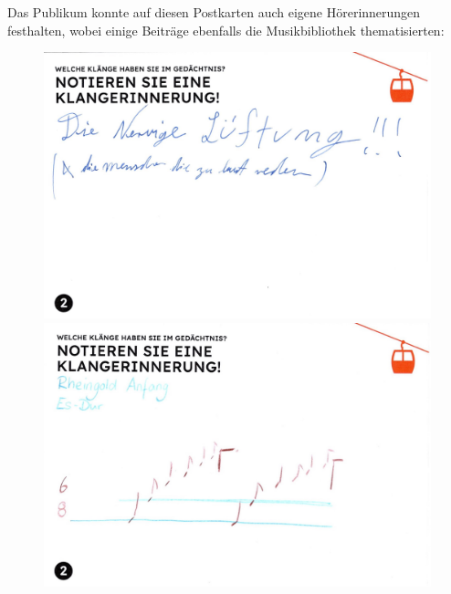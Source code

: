 \documentclass[a4paper,
fontsize=11pt,
oneside,
numbers=noperiodatend,
parskip=half-,
bibliography=totoc,
final
]{scrartcl}
\begin{document}
Das Publikum konnte auf diesen Postkarten auch eigene Hörerinnerungen
festhalten, wobei einige Beiträge ebenfalls die Musikbibliothek
thematisierten:

\begin{figure}[h]
    \centering
    \begin{minipage}[b]{0.32\textwidth}
        \centering
        \includegraphics[width=\textwidth]{img/Abb10.jpg}
    \end{minipage}
    \begin{minipage}[b]{0.32\textwidth}
        \centering
        \includegraphics[width=\textwidth]{img/Abb11.jpg}
    \end{minipage}
    \begin{minipage}[b]{0.32\textwidth}
        \centering

\end{minipage}
\end{figure}
\end{document}
